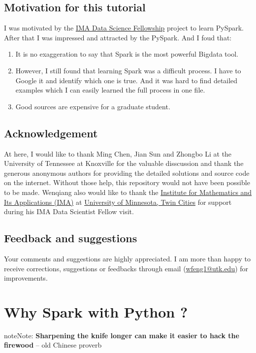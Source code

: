 \documentclass[letterpaper,11pt,english]{sphinxmanual}
\begin{document}
\section{Motivation for this tutorial}
\label{preface:motivation-for-this-tutorial}
I was motivated by the \href{https://www.ima.umn.edu/2016-2017/SW1.23-3.10.17\#}{IMA Data Science Fellowship}
project to learn PySpark. After that I was impressed and attracted by the
PySpark. And I foud that:
\begin{enumerate}
\item {} 
It is no exaggeration to say that Spark is the most powerful
Bigdata tool.

\item {} 
However, I still found that learning Spark was a difficult
process. I have to Google it and identify which one is true.
And it was hard to find detailed examples which I can easily
learned the full process in one file.

\item {} 
Good sources are expensive for a graduate student.

\end{enumerate}


\section{Acknowledgement}
\label{preface:acknowledgement}
At here, I would like to thank Ming Chen, Jian Sun and Zhongbo Li at the
University of Tennessee at Knoxville for the valuable disscussion
and thank the generous anonymous authors for providing the detailed
solutions and source code on the internet. Without those help,
this repository would not have been possible to be made. Wenqiang
also would like to thank the \href{https://www.ima.umn.edu/}{Institute for Mathematics and Its
Applications (IMA)} at \href{https://twin-cities.umn.edu/}{University of Minnesota, Twin Cities}
for support during his IMA Data Scientist Fellow visit.


\section{Feedback and suggestions}
\label{preface:feedback-and-suggestions}
Your comments and suggestions are highly appreciated. I am more
than happy to receive corrections, suggestions or feedbacks through
email (\href{mailto:wfeng1@utk.edu}{wfeng1@utk.edu}) for improvements.


\chapter{Why Spark with Python ?}
\label{why:university-of-minnesota-twin-cities}\label{why::doc}\label{why:why}\label{why:why-spark-with-python}
\begin{notice}{note}{Note:}
\textbf{Sharpening the knife longer can make it easier to hack the firewood} -- old Chinese proverb
\end{notice}
\end{document}
